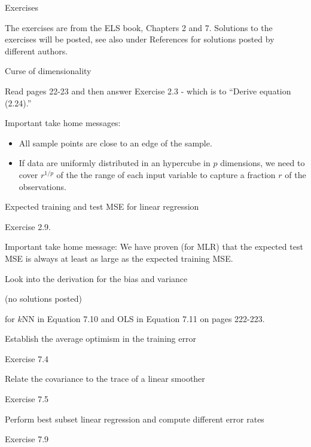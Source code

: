 \documentclass[
  ignorenonframetext,
]{beamer}
\providecommand{\tightlist}{%
  \setlength{\itemsep}{0pt}\setlength{\parskip}{0pt}}
\begin{document}
\begin{frame}{Exercises}
\protect\hypertarget{exercises}{}

The exercises are from the ELS book, Chapters 2 and 7. Solutions to the
exercises will be posted, see also under References for solutions posted
by different authors.

\begin{block}{Curse of dimensionality}

Read pages 22-23 and then answer Exercise 2.3 - which is to ``Derive
equation (2.24).''

Important take home messages:

\begin{itemize}
\tightlist
\item
  All sample points are close to an edge of the sample.
\item
  If data are uniformly distributed in an hypercube in \(p\) dimensions,
  we need to cover \(r^{1/p}\) of the the range of each input variable
  to capture a fraction \(r\) of the observations.
\end{itemize}

\end{block}

\begin{block}{Expected training and test MSE for linear regression}

Exercise 2.9.

Important take home message: We have proven (for MLR) that the expected
test MSE is always at least as large as the expected training MSE.

\end{block}

\end{frame}

\begin{frame}

\begin{block}{Look into the derivation for the bias and variance}

(no solutions posted)

for \(k\)NN in Equation 7.10 and OLS in Equation 7.11 on pages 222-223.

\end{block}

\begin{block}{Establish the average optimism in the training error}

Exercise 7.4

\end{block}

\begin{block}{Relate the covariance to the trace of a linear smoother}

Exercise 7.5

\end{block}

\begin{block}{Perform best subset linear regression and compute
different error rates}

Exercise 7.9

\end{block}

\end{frame}
\end{document}
